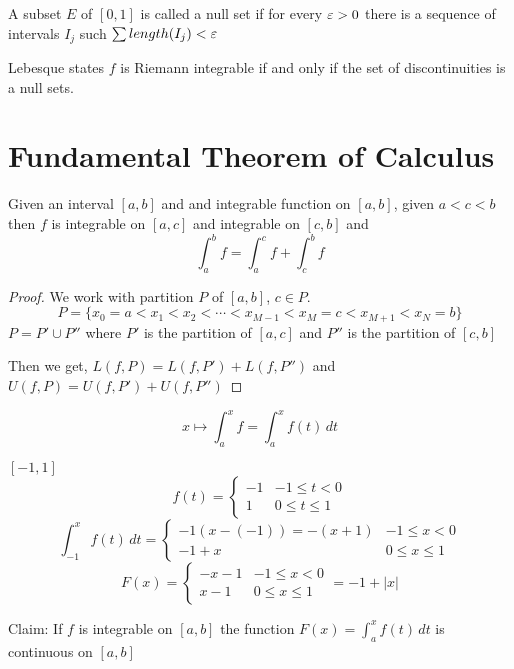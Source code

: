 \begin{theorem*}[Lebesgue]
  A subset $E$ of $[0, 1]$ is called a null set if for every $\varepsilon > 0$ 
  there is a sequence  of intervals $I_j$ such $\sum length(I_j) < \varepsilon$

  Lebesque states $f$ is Riemann integrable if and only if the set of discontinuities is a null sets.
\end{theorem*}

\section{Fundamental Theorem of Calculus}

\begin{theorem*}
  Given an interval $[a, b]$ and and integrable function on $[a, b]$, given $a < c < b$
  then $f$ is integrable on $[a, c]$ and integrable on $[c, b]$ and
  \[\int_a^b f = \int_a^c f + \int_c^b f \]
\end{theorem*}

\begin{proof}
  We work with partition $P$ of $[a, b]$, $c\in P$. 
  \[P = \{x_0 = a < x_1 < x_2 < \cdots < x_{M-1} < x_M = c < x_{M+1} < x_N = b\}\]
  $P = P' \cup P''$ where $P'$ is the partition of $[a, c]$ and $P''$ is the partition of $[c, b]$

  Then we get, 
  $L(f, P) = L(f, P') + L(f, P'')$ and 
  $U(f, P) = U(f, P') + U(f, P'')$
\end{proof}

\[ x \mapsto \int_a^x f = \int_a^x f(t) \,dt \]

\begin{example*}
  $[-1, 1]$
  \[ f(t) = \begin{cases}
    -1 & -1 \le t < 0 \\
    1 &  0 \le t \le 1
  \end{cases}
    \]
  \[ \int_{-1}^x f(t)\,dt = \begin{cases}
    -1(x-(-1)) = -(x+1) & -1 \le x < 0 \\
    -1+x & 0 \le x \le 1
  \end{cases}
  \]
  \[ F(x) = \begin{cases}
    -x-1 & -1 \le x < 0 \\
    x-1 & 0 \le x \le 1
  \end{cases} = -1+|x|
  \]
\end{example*}

Claim: If $f$ is integrable on $[a, b]$ the function $\displaystyle F(x) = \int_a^x f(t) \,dt$ is continuous on $[a, b]$

